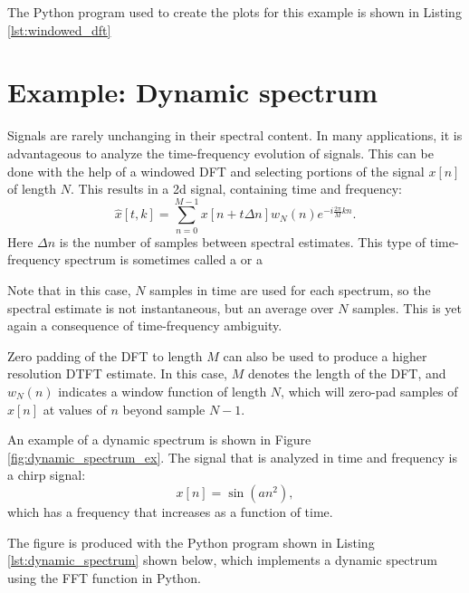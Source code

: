 The Python program used to create the plots for this example is shown in Listing \ref{lst:windowed_dft}





\section{Example: Dynamic spectrum}

Signals are rarely unchanging in their spectral content. In many
applications, it is advantageous to analyze the time-frequency
evolution of signals. This can be done with the help of a windowed DFT
and selecting portions of the signal $x[n]$ of length $N$. This
results in a 2d signal, containing time and frequency:
\begin{equation}
    \hat{x}[t,k] = \sum_{n=0}^{M-1} x[n+t\Delta n] w_N(n) e^{-i\frac{2\pi}{M}kn}.
\end{equation}
Here $\Delta n$ is the number of samples between spectral
estimates. This type of time-frequency spectrum is sometimes called
a \emph{} or
a \emph{}

Note that in this case, $N$ samples in time are used for each
spectrum, so the spectral estimate is not instantaneous, but an
average over $N$ samples. This is yet again a consequence of
time-frequency ambiguity.

Zero padding of the DFT to length $M$ can also be used to produce a
higher resolution DTFT estimate. In this case, $M$ denotes the length
of the DFT, and $w_N(n)$ indicates a window function of length $N$,
which will zero-pad samples of $x[n]$ at values of $n$ beyond sample
$N-1$.

An example of a dynamic spectrum is shown in
Figure \ref{fig:dynamic_spectrum_ex}. The signal that is analyzed in
time and frequency is a chirp signal:
\begin{equation}
    x[n]=\sin(a n^2),
\end{equation}
which has a frequency that increases as a function of time.

The figure is produced with the Python program shown in
Listing \ref{lst:dynamic_spectrum} shown below, which implements
a dynamic spectrum using the FFT function in Python.

